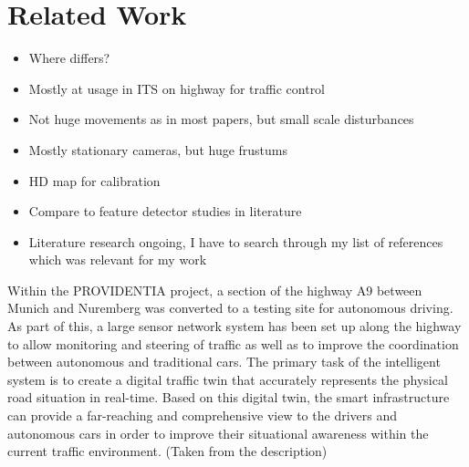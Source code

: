 \section{Related Work}
\begin{itemize}
\item Where differs?
  \item Mostly at usage in ITS on highway for traffic control
  \item Not huge movements as in most papers, but small scale disturbances
  \item Mostly stationary cameras, but huge frustums
  \item HD map for calibration
\item Compare to feature detector studies in literature
\item Literature research ongoing, I have to search through my list of references which was relevant for my work
\end{itemize}


Within the PROVIDENTIA project, a section of the highway A9 between Munich and Nuremberg was converted to a testing site for autonomous driving. 
As part of this, a large sensor network system has been set up along the highway to allow monitoring and steering of traffic as well as to improve the coordination between autonomous and traditional cars. 
The primary task of the intelligent system is to create a digital traffic twin that accurately represents the physical road situation in real-time. 
Based on this digital twin, the smart infrastructure can provide a far-reaching and comprehensive view to the drivers and autonomous cars in order to improve their situational awareness within the current traffic environment.
(Taken from the description) 